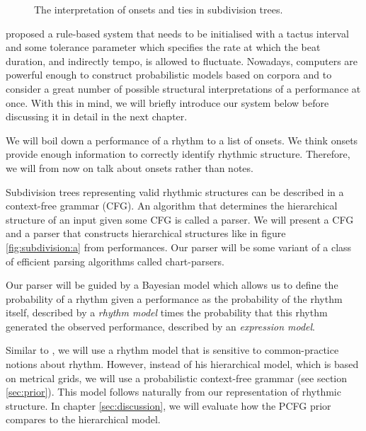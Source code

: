\begin{figure}
\centering
{}

\caption{The interpretation of onsets and ties in subdivision trees.}
\label{fig:ties}
\end{figure}

\citet{longuet1976perception} proposed a rule-based system that needs to be initialised with a tactus interval and some tolerance parameter which specifies the rate at which the beat duration, and indirectly tempo, is allowed to fluctuate. Nowadays, computers are powerful enough to construct probabilistic models based on corpora and to consider a great number of possible structural interpretations of a performance at once. With this in mind, we will briefly introduce our system below before discussing it in detail in the next chapter.

We will boil down a performance of a rhythm to a list of onsets. We think onsets provide enough information to correctly identify rhythmic structure. Therefore, we will from now on talk about onsets rather than notes.

Subdivision trees representing valid rhythmic structures can be described in a context-free grammar (CFG). An algorithm that determines the hierarchical structure of an input given some CFG is called a parser. We will present a CFG and a parser that constructs hierarchical structures like in figure \ref{fig:subdivision:a} from performances. Our parser will be some variant of a class of efficient parsing algorithms called chart-parsers.

Our parser will be guided by a Bayesian model which allows us to define the probability of a rhythm given a performance as the probability of the rhythm itself, described by a \textit{rhythm model} times the probability that this rhythm generated the observed performance, described by an \textit{expression model}.

Similar to \cite{temperley2009unified}, we will use a rhythm model that is sensitive to common-practice notions about rhythm. However, instead of his hierarchical model, which is based on metrical grids, we will use a probabilistic context-free grammar (see section \ref{sec:prior}). This model follows naturally from our representation of rhythmic structure. In chapter \ref{sec:discussion}, we will evaluate how the PCFG prior compares to the hierarchical model.

